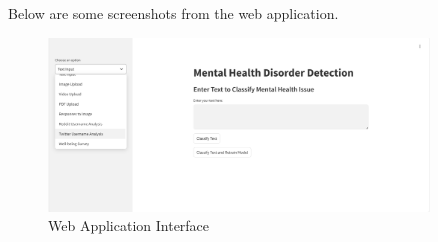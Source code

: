 
\noindent
Below are some screenshots from the web application.

\begin{figure}[h!]  
    \centering
    \includegraphics[width=0.9\textwidth]{App Images/01 Interface.png}  
    \caption*{Web Application Interface}
    \label{01i}  %
\end{figure}

\pagebreak


